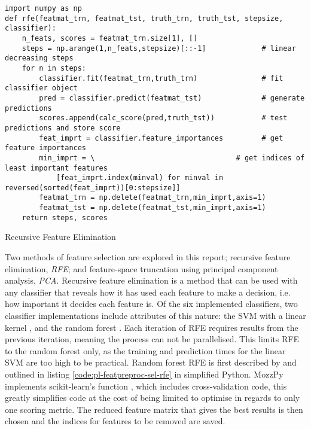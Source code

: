         \begin{listing}[ht]
            \begin{verbatim}
import numpy as np
def rfe(featmat_trn, featmat_tst, truth_trn, truth_tst, stepsize, classifier):
    n_feats, scores = featmat_trn.size[1], []
    steps = np.arange(1,n_feats,stepsize)[::-1]             # linear decreasing steps
    for n in steps:          
        classifier.fit(featmat_trn,truth_trn)               # fit classifier object
        pred = classifier.predict(featmat_tst)              # generate predictions
        scores.append(calc_score(pred,truth_tst))           # test predictions and store score
        feat_imprt = classifier.feature_importances         # get feature importances
        min_imprt = \                                 # get indices of least important features
            [feat_imprt.index(minval) for minval in reversed(sorted(feat_imprt))[0:stepsize]] 
        featmat_trn = np.delete(featmat_trn,min_imprt,axis=1) 
        featmat_tst = np.delete(featmat_tst,min_imprt,axis=1)
    return steps, scores
            \end{verbatim}
            \caption{Recursive Feature Elimination}
            \label{code:pl-featpreproc-sel-rfe}
        \end{listing}
        
        Two methods of feature selection are explored in this report; recursive feature elimination, \textit{RFE}; and feature-space truncation using principal component analysis, \textit{PCA}. Recursive feature elimination is a method that can be used with any classifier that reveals how it has used each feature to make a decision, i.e. how important it decides each feature is. Of the six implemented classifiers, two classifier implementations include attributes of this nature: the SVM with a linear kernel \cite{Guyon2002}, and the random forest \cite{Granitto2006}. Each iteration of RFE requires results from the previous iteration, meaning the process can not be parallelised. This limits RFE to the random forest only, as the training and prediction times for the linear SVM are too high to be practical. Random forest RFE is first described by \textcite{Granitto2006} and outlined in listing \ref{code:pl-featpreproc-sel-rfe} in simplified Python. MozzPy implements scikit-learn's function  \cite{Pedregosa2012}, which includes cross-validation code, this greatly simplifies code at the cost of being limited to optimise in regards to only one scoring metric. The reduced feature matrix that gives the best results is then chosen and the indices for features to be removed are saved.
        
